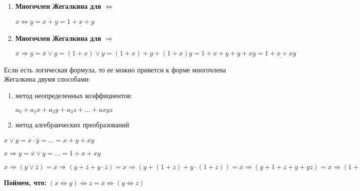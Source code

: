\documentclass[russian]{lecture-notes}
\begin{document}
\begin{sloppypar}
\begin{enumerate}
{		$x \lor y = (x = \overline{a}, y = \overline{y}) = \overline{ab} = \overline{\overline{x} \cdot \overline{y}} = \overline{(1 + x)(1 + y)} = 1 + (1 + x)(1 + y) = 1 + 1 + x + y + xy = \underline{x + y + xy}$
	} 

	\item{
		\textbf{Многочлен Жегалкина для $\Leftrightarrow$}

		$x \Leftrightarrow y = \overline{x + y} = \underline{1 + x + y}$
	}

	\item{
		\textbf{Многочлен Жегалкина для $\Rightarrow$}	
		
		$x \Rightarrow y = \overline{x} \lor y = (1 + x) \lor y = (1 + x) + y + (1 + x)y = 1 + x + y + y + xy = \underline{1 + x + xy}$ 
	}
\end{enumerate}

\begin{remark}

	Если есть логическая формула, то ее можно приветси к форме многочлена Жегалкина двумя способами:

\begin{enumerate}
	\item{
		метод неопределенных коэффициентов:
		
		$a_0 + a_1x + a_2y + a_3z + \dots + axyz$	
	}
	\item{
		метод алгебраических преобразований	
	}
\end{enumerate}	

\begin{example}
	$x \lor y = \overline{\overline{x} \cdot \overline{y}} = \dots = x + y + xy$
\end{example}

\begin{example}
	$x \Rightarrow y = \overline{x} \lor y = \dots = 1 + x + xy$
\end{example}

\begin{example}
	$x \Rightarrow (y \lor \overline{z}) = x \Rightarrow (y + \overline{z} + y \cdot \overline{z}) = x \Rightarrow (y + (1 + z) + y \cdot (1 + z))  = x \Rightarrow (y + 1 + z + y + yz) = x \Rightarrow (1 + z + yz) = 1 + x + x(1 + z + yz) = 1 + x + x + xz + xyz = 1 + xz + xyz $
\end{example}

\end{remark}

\textbf{Поймем, что:}
	$(x \Leftrightarrow y) \Leftrightarrow z = x \Leftrightarrow (y \Leftrightarrow z)$
	

\end{sloppypar}
\end{document}
